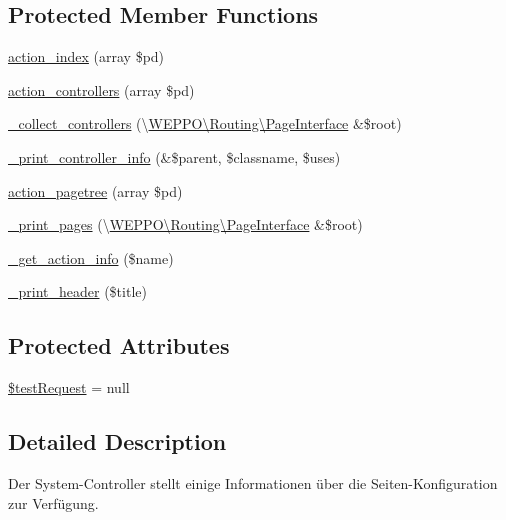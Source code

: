 \subsection*{Protected Member Functions}
\begin{DoxyCompactItemize}
\item 
\hyperlink{classWEPPO_1_1Controller_1_1SystemController_adb3cf859b53d7fab9001753a1ba00772}{action\+\_\+index} (array \$pd)
\item 
\hyperlink{classWEPPO_1_1Controller_1_1SystemController_ab5eabc9bda8fc4925e91b6ee111c879f}{action\+\_\+controllers} (array \$pd)
\item 
\hyperlink{classWEPPO_1_1Controller_1_1SystemController_a5a13ad1f6ab454f752bb27f4a4de11e9}{\+\_\+collect\+\_\+controllers} (\textbackslash{}\hyperlink{interfaceWEPPO_1_1Routing_1_1PageInterface}{W\+E\+P\+P\+O\textbackslash{}\+Routing\textbackslash{}\+Page\+Interface} \&\$root)
\item 
\hyperlink{classWEPPO_1_1Controller_1_1SystemController_a927787c038886a3b6029773ec30df5ce}{\+\_\+print\+\_\+controller\+\_\+info} (\&\$parent, \$classname, \$uses)
\item 
\hyperlink{classWEPPO_1_1Controller_1_1SystemController_a77170c639d18ddf42dec56a436b85064}{action\+\_\+pagetree} (array \$pd)
\item 
\hyperlink{classWEPPO_1_1Controller_1_1SystemController_ae7196f4fdf82e3cb2aa16ad5cf2d5495}{\+\_\+print\+\_\+pages} (\textbackslash{}\hyperlink{interfaceWEPPO_1_1Routing_1_1PageInterface}{W\+E\+P\+P\+O\textbackslash{}\+Routing\textbackslash{}\+Page\+Interface} \&\$root)
\item 
\hyperlink{classWEPPO_1_1Controller_1_1SystemController_afa20fd606ec5cf6de5ca68e7eabc909e}{\+\_\+get\+\_\+action\+\_\+info} (\$name)
\item 
\hyperlink{classWEPPO_1_1Controller_1_1SystemController_a3560293d4e5f6beab77f26e82507e0d2}{\+\_\+print\+\_\+header} (\$title)
\end{DoxyCompactItemize}
\subsection*{Protected Attributes}
\begin{DoxyCompactItemize}
\item 
\hyperlink{classWEPPO_1_1Controller_1_1SystemController_add05530beca6cea0df53af932006304e}{\$test\+Request} = null
\end{DoxyCompactItemize}


\subsection{Detailed Description}
Der System-\/\+Controller stellt einige Informationen über die Seiten-\/\+Konfiguration zur Verfügung.

